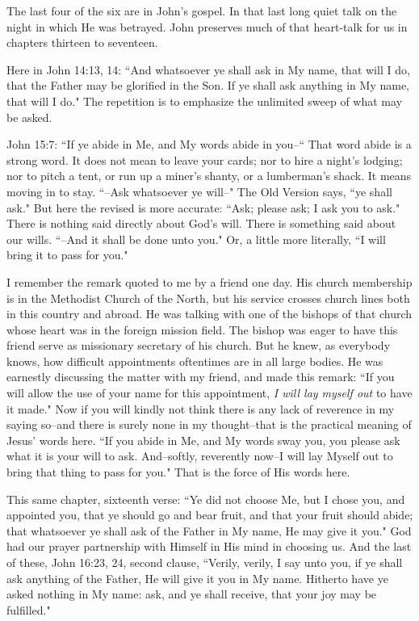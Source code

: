 The last four of the six are in John's gospel. In that last long quiet
talk on the night in which He was betrayed. John preserves much of that
heart-talk for us in chapters thirteen to seventeen.

Here in John 14:13, 14: ``And whatsoever ye shall ask in My name, that will
I do, that the Father may be glorified in the Son. If ye shall ask
anything in My name, that will I do." The repetition is to emphasize the
unlimited sweep of what may be asked.

John 15:7: ``If ye abide in Me, and My words abide in you--`` That word
abide is a strong word. It does not mean to leave your cards; nor to hire
a night's lodging; nor to pitch a tent, or run up a miner's shanty, or a
lumberman's shack. It means moving in to stay. ``--Ask whatsoever ye
will--" The Old Version says, ``ye shall ask." But here the revised is more
accurate: ``Ask; please ask; I ask you to ask." There is nothing said
directly about God's will. There is something said about our wills. ``--And
it shall be done unto you." Or, a little more literally, ``I will bring it
to pass for you."

I remember the remark quoted to me by a friend one day. His church
membership is in the Methodist Church of the North, but his service
crosses church lines both in this country and abroad. He was talking with
one of the bishops of that church whose heart was in the foreign mission
field. The bishop was eager to have this friend serve as missionary
secretary of his church. But he knew, as everybody knows, how difficult
appointments oftentimes are in all large bodies. He was earnestly
discussing the matter with my friend, and made this remark: ``If you will
allow the use of your name for this appointment, \textit{I will lay myself out}
to have it made." Now if you will kindly not think there is any lack of
reverence in my saying so--and there is surely none in my thought--that is
the practical meaning of Jesus' words here. ``If you abide in Me, and My
words sway you, you please ask what it is your will to ask. And--softly,
reverently now--I will lay Myself out to bring that thing to pass for
you." That is the force of His words here.

This same chapter, sixteenth verse: ``Ye did not choose Me, but I chose
you, and appointed you, that ye should go and bear fruit, and that your
fruit should abide; that whatsoever ye shall ask of the Father in My name,
He may give it you." God had our prayer partnership with Himself in His
mind in choosing us. And the last of these, John 16:23, 24, second clause,
``Verily, verily, I say unto you, if ye shall ask anything of the Father,
He will give it you in My name. Hitherto have ye asked nothing in My name:
ask, and ye shall receive, that your joy may be fulfilled."

